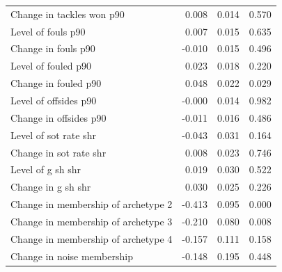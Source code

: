 \begin{tabular}{lrrr}
Change in tackles won p90 & 0.008 & 0.014 & 0.570 \\
Level of fouls p90 & 0.007 & 0.015 & 0.635 \\
Change in fouls p90 & -0.010 & 0.015 & 0.496 \\
Level of fouled p90 & 0.023 & 0.018 & 0.220 \\
Change in fouled p90 & 0.048 & 0.022 & 0.029 \\
Level of offsides p90 & -0.000 & 0.014 & 0.982 \\
Change in offsides p90 & -0.011 & 0.016 & 0.486 \\
Level of sot rate shr & -0.043 & 0.031 & 0.164 \\
Change in sot rate shr & 0.008 & 0.023 & 0.746 \\
Level of g sh shr & 0.019 & 0.030 & 0.522 \\
Change in g sh shr & 0.030 & 0.025 & 0.226 \\
Change in membership of archetype 2 & -0.413 & 0.095 & 0.000 \\
Change in membership of archetype 3 & -0.210 & 0.080 & 0.008 \\
Change in membership of archetype 4 & -0.157 & 0.111 & 0.158 \\
Change in noise membership & -0.148 & 0.195 & 0.448 \\
\bottomrule
\end{tabular}
